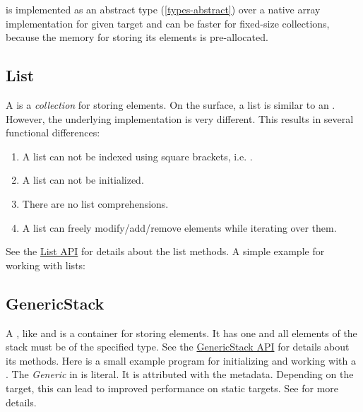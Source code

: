 
 is implemented as an abstract type (\ref{types-abstract}) over a native array implementation for given target and can be faster for fixed-size collections, because the memory for storing its elements is pre-allocated.

\subsection{List}
\label{std-List}
A  is a \emph{collection} for storing elements.  On the surface, a list is similar to an .  However, the underlying implementation is very different.  This results in several functional differences:

\begin{enumerate}
	\item A list can not be indexed using square brackets, i.e. \expr{[0]}.
	\item A list can not be initialized.
	\item There are no list comprehensions.
	\item A list can freely modify/add/remove elements while iterating over them.
\end{enumerate}

See the \href{http://api.haxe.org/List.html}{List API} for details about the list methods.  A simple example for working with lists:

\subsection{GenericStack}
\label{std-GenericStack}
A , like  and  is a container for storing elements.  It has one  and all elements of the stack must be of the specified type. See the \href{http://api.haxe.org/haxe/ds/GenericStack.html}{GenericStack API} for details about its methods.  Here is a small example program for initializing and working with a .
The \emph{Generic} in  is literal.  It is attributed with the  metadata.  Depending on the target, this can lead to improved performance on static targets.  See  for more details.



